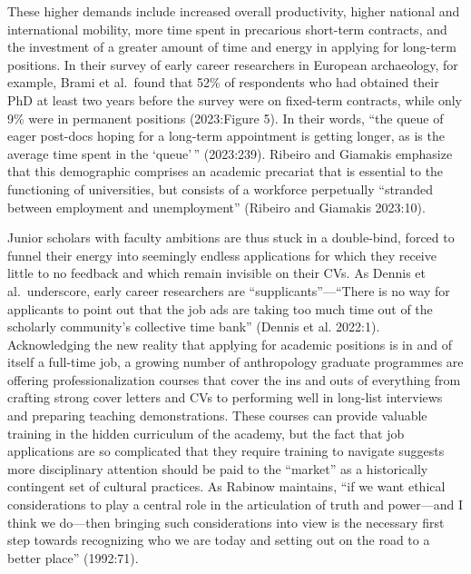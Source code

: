 \documentclass[
  12pt,
]{article}
\begin{document}
These higher demands include increased overall productivity, higher
national and international mobility, more time spent in precarious
short-term contracts, and the investment of a greater amount of time and
energy in applying for long-term positions. In their survey of early
career researchers in European archaeology, for example, Brami et
al.~found that 52\% of respondents who had obtained their PhD at least
two years before the survey were on fixed-term contracts, while only 9\%
were in permanent positions (2023:Figure 5). In their words, ``the queue
of eager post-docs hoping for a long-term appointment is getting longer,
as is the average time spent in the `queue'\,'' (2023:239). Ribeiro and
Giamakis emphasize that this demographic comprises an academic precariat
that is essential to the functioning of universities, but consists of a
workforce perpetually ``stranded between employment and unemployment''
(Ribeiro and Giamakis 2023:10).

Junior scholars with faculty ambitions are thus stuck in a double-bind,
forced to funnel their energy into seemingly endless applications for
which they receive little to no feedback and which remain invisible on
their CVs. As Dennis et al.~underscore, early career researchers are
``supplicants''---``There is no way for applicants to point out that the
job ads are taking too much time out of the scholarly community's
collective time bank'' (Dennis et al. 2022:1). Acknowledging the new
reality that applying for academic positions is in and of itself a
full-time job, a growing number of anthropology graduate programmes are
offering professionalization courses that cover the ins and outs of
everything from crafting strong cover letters and CVs to performing well
in long-list interviews and preparing teaching demonstrations. These
courses can provide valuable training in the hidden curriculum of the
academy, but the fact that job applications are so complicated that they
require training to navigate suggests more disciplinary attention should
be paid to the ``market'' as a historically contingent set of cultural
practices. As Rabinow maintains, ``if we want ethical considerations to
play a central role in the articulation of truth and power---and I think
we do---then bringing such considerations into view is the necessary
first step towards recognizing who we are today and setting out on the
road to a better place'' (1992:71).
\end{document}
